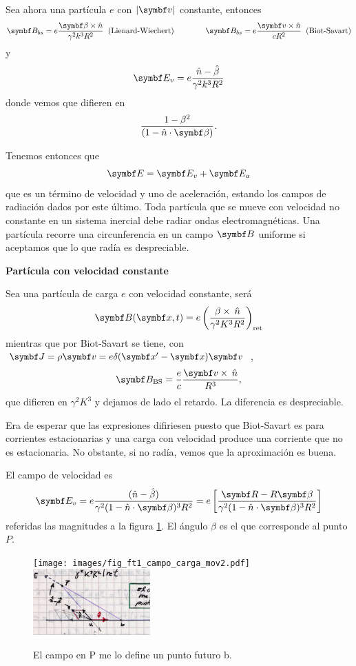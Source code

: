 \documentclass[10pt,oneside]{CBFT_book}
\begin{document}
Sea ahora una partícula $e$ con $|\vb{v}|$ constante, entonces 
\[
	\vb{B}_{bs} = e\frac{\vb{\beta}\times\hat{n}}{\gamma^2k^3R^2} \;\; \text{(Lienard-Wiechert)}
	\qquad \qquad 
	\vb{B}_{bs} = e\frac{\vb{v}\times\hat{n}}{cR^2} \;\; \text{(Biot-Savart)}
\]
y 
\[
	\vb{E}_{v} = e\frac{ \hat{n}- \hat{\beta} }{\gamma^2k^3R^2}
\]
donde vemos que difieren en 
\[
	\frac{1-\beta^2}{(1-\hat{n}\cdot{\vb{\beta}})}.
\]

Tenemos entonces que
\[
	\vb{E}  = \vb{E}_v  + \vb{E}_a 
\]
que es un término de velocidad y uno de aceleración, estando los campos de radiación dados por
este último.
Toda partícula que se mueve con velocidad no constante en un sistema inercial debe radiar ondas
electromagnéticas.
Una partícula recorre una circunferencia en un campo $\vb B$ uniforme si aceptamos que lo que radía
es despreciable.

\begin{ejemplo}{\bf Partícula con velocidad constante}

Sea una partícula de carga $e$ con velocidad constante, será
\[
	\vb{B}(\vbx,t) = e \Frac{\beta\times\nver}{\gamma^2K^3R^2}_\text{ret}
\]
mientras que por Biot-Savart se tiene, con $\vb J = \rho \vb v = e \delta(\vbx'-\vbx)\vb v$ ,
\[
	\vb{B}_\text{BS} = \frac{e}{c} \frac{\vb v \times \nver }{R^3},
\]
que difieren en $\gamma^2K^3$ y dejamos de lado el retardo. La diferencia es despreciable.

Era de esperar que las expresiones difiriesen puesto que Biot-Savart es para corrientes
estacionarias y una carga con velocidad produce una corriente que no es estacionaria.
No obstante, si no radía, vemos que la aproximación es buena.
 
\end{ejemplo}


El campo de velocidad es 
\[
	\vb{E}_v = e \frac{(\hat{n}-\hat{\beta})}{\gamma^2(1-\hat{n}\cdot\vb{\beta})^3R^2} =
		e \left[ \frac{\vb{R}-R\vb{\beta}}{\gamma^2(1-\hat{n}\cdot\vb{\beta})^3R^2} \right]
\]
referidas las magnitudes a la figura \ref{fig_ft1_campo_carga_mov}. 
El ángulo $\beta$ es el que corresponde al punto $P$.

\begin{figure}[htb]
	\begin{center}
	\texttt{[image: images/fig\_ft1\_campo\_carga\_mov2.pdf]}
	\includegraphics[width=0.4\textwidth]{images/fig_ft1_campo_carga_mov2JPG.jpg}
	\end{center}
	\caption{El campo en P me lo define un punto futuro b.}
	\label{fig_ft1_campo_carga_mov}
\end{figure} 
\end{document}
